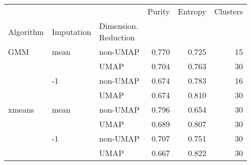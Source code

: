 \begin{tabular}{lllrrr}
\toprule
       &    &      &  Purity &  Entropy &  Clusters \\
Algorithm & Imputation & \thead{Dimension. \\Reduction} &         &          &           \\
\midrule
GMM & mean & non-UMAP &   0.770 &    0.725 &        15 \\
       &    & UMAP &   0.704 &    0.763 &        30 \\
       & -1 & non-UMAP &   0.674 &    0.783 &        16 \\
       &    & UMAP &   0.674 &    0.810 &        30 \\
xmeans & mean & non-UMAP &   0.796 &    0.654 &        30 \\
       &    & UMAP &   0.689 &    0.807 &        30 \\
       & -1 & non-UMAP &   0.707 &    0.751 &        30 \\
       &    & UMAP &   0.667 &    0.822 &        30 \\
\bottomrule
\end{tabular}
